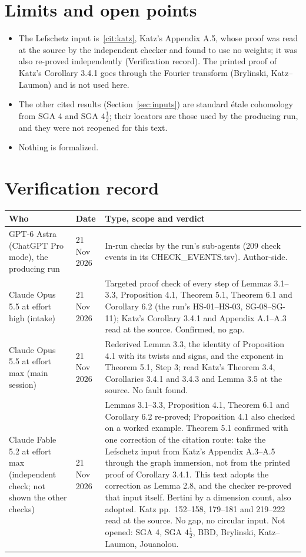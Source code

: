 \documentclass[11pt,a4paper]{article}
\theoremstyle{plain}
\theoremstyle{definition}
\theoremstyle{remark}
\newcommand{\fixedhead}[1]{\section*{#1}}
\begin{document}
\fixedhead{Limits and open points}

\begin{itemize}[leftmargin=*]
\item The Lefschetz input is~\ref{cit:katz}, Katz's Appendix A.5, whose proof was read at the source by the independent
checker and found to use no weights; it was also re-proved independently (Verification record). The printed proof of
Katz's Corollary 3.4.1 goes through the Fourier transform (Brylinski, Katz--Laumon) and is not used here.
\item The other cited results (Section~\ref{sec:inputs}) are standard \'etale cohomology from SGA 4 and SGA $4\frac12$;
their locators are those used by the producing run, and they were not reopened for this text.
\item Nothing is formalized.
\end{itemize}

\fixedhead{Verification record}

\noindent
\begin{tabularx}{\textwidth}{@{}L{3.4cm}L{2.0cm}Y@{}}
\toprule
Who & Date & Type, scope and verdict\\
\midrule
GPT-6 Astra (ChatGPT Pro mode), the producing run & 21 Nov 2026 & In-run checks by the run's sub-agents (209 check
events in its CHECK\_EVENTS.tsv). Author-side.\\
Claude Opus 5.5 at effort high (intake) & 21 Nov 2026 & Targeted proof check of every step of Lemmas 3.1--3.3,
Proposition 4.1, Theorem 5.1, Theorem 6.1 and Corollary 6.2 (the run's HS-01--HS-03, SG-08--SG-11); Katz's Corollary
3.4.1 and Appendix A.1--A.3 read at the source. Confirmed, no gap.\\
Claude Opus 5.5 at effort max (main session) & 21 Nov 2026 & Rederived Lemma 3.3, the identity of Proposition 4.1 with its
twists and signs, and the exponent in Theorem 5.1, Step 3; read Katz's Theorem 3.4, Corollaries 3.4.1 and 3.4.3 and
Lemma 3.5 at the source. No fault found.\\
Claude Fable 5.2 at effort max (independent check; not shown the other checks) & 21 Nov 2026 & Lemmas 3.1--3.3,
Proposition 4.1, Theorem 6.1 and Corollary 6.2 re-proved; Proposition 4.1 also checked on a worked example. Theorem 5.1
confirmed with one correction of the citation route: take the Lefschetz input from Katz's Appendix A.3--A.5 through the
graph immersion, not from the printed proof of Corollary 3.4.1. This text adopts the correction as Lemma 2.8, and the
checker re-proved that input itself. Bertini by a dimension count, also adopted. Katz pp.~152--158, 179--181 and 219--222
read at the source. No gap, no circular input. Not opened: SGA 4, SGA $4\frac12$, BBD, Brylinski, Katz--Laumon,
Jouanolou.\\
\bottomrule
\end{tabularx}
\end{document}
